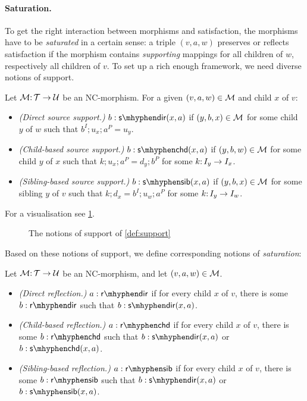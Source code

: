 \paragraph{Saturation.}

To get the right interaction between morphisms and satisfaction, the morphisms have to be \emph{saturated} in a certain sense: a triple $(v,a,w)$ preserves or reflects satisfaction if the morphism contains \emph{supporting} mappings for all children of $w$, respectively all children of $v$. To set up a rich enough framework, we need diverse notions of support.

\begin{definition}\label{def:support}
Let ${\mathcal{M}}{:}\, {\mathcal{T}}\rightarrow{\mathcal{U}}$ be an NC-morphism. For a given $(v,a,w)\in {\mathcal{M}}$ and child $x$ of $v$:
\begin{itemize}[topsep=\smallskipamount]
\item \emph{(Direct source support.)} $\issdir b{x,a}$ if $(y,b,x)\in{\mathcal{M}}$ for some child $y$ of $w$ such that $b^I;u_x;a^P=u_y$.
\item \emph{(Child-based source support.)} $\isschd b{x,a}$ if $(y,b,w)\in{\mathcal{M}}$ for some child $y$ of $x$ such that $k;u_x;a^P=d_y;b^P$ for some $k{:}\, I_y\rightarrow I_x$.
\item \emph{(Sibling-based source support.)} $\isssib b{x,a}$ if $(y,b,x)\in{\mathcal{M}}$ for some sibling $y$ of $v$ such that $k;d_x=b^I;u_w;a^P$ for some $k{:}\, I_y\rightarrow I_w$.
\end{itemize}
\end{definition}
%
For a visualisation see \cref{fig:source-saturation}.
%
\begin{figure}
	
	\caption{The notions of support of \cref{def:support}}
	\label{fig:source-saturation}
\end{figure}
%
Based on these notions of support, we define corresponding notions of \emph{saturation}:

\begin{definition}\label{def:syntactic reflection}
Let ${\mathcal{M}}{:}\, {\mathcal{T}}\rightarrow{\mathcal{U}}$ be an NC-morphism, and let $(v,a,w)\in {\mathcal{M}}$.
\begin{itemize}[topsep=\smallskipamount]
\item \emph{(Direct reflection.)} $a:\rdir$ if for every child $x$ of $v$, there is some $b:\rdir$ such that $\issdir b{x,a}$.
\item \emph{(Child-based reflection.)} $a:\rchd$ if for every child $x$ of $v$, there is some $b:\rchd$ such that $\issdir b{x,a}$ or $\isschd b{x,a}$.
\item \emph{(Sibling-based reflection.)} $a:\rsib$ if for every child $x$ of $v$, there is some $b:\rsib$ such that $\issdir b{x,a}$ or $\isssib b{x,a}$.
\end{itemize}
\end{definition}

